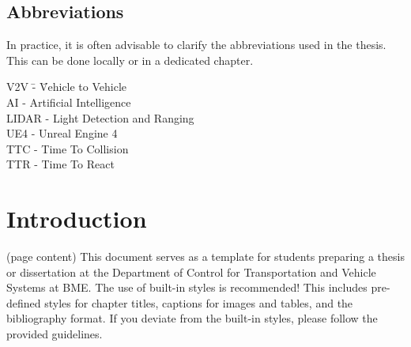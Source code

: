 \documentclass[12pt, a4paper, titlepage, onehalfspacing]{report}
\begin{document}
\tableofcontents
\begin{abstract}
Lorem ipsum dolor sit amet, consectetur adipiscing elit. Ut quam odio, ultrices vitae ornare aliquam, lacinia id ligula. Aliquam accumsan dictum arcu non consequat. Aliquam fringilla nulla nibh, feugiat auctor sem hendrerit eget. Integer efficitur nulla et venenatis cursus. Vivamus vel sem nunc. Sed erat ex, pulvinar at sapien sed, lacinia bibendum nunc. Nam tincidunt quam a lacinia tempus. Fusce eget rutrum purus. Ut malesuada consectetur ex, a blandit velit viverra non. Nam sit amet luctus quam. Praesent eu dolor blandit, dignissim lorem non, bibendum urna. Maecenas condimentum enim ut tortor venenatis, ac cursus nunc rutrum. Aliquam ipsum risus, varius ac consectetur vulputate, tristique non odio. Quisque a tristique neque, quis malesuada nunc.

Donec sed sem ac magna tristique venenatis porttitor ut nunc. Etiam convallis nec tortor nec posuere. Nullam a volutpat urna. Nullam dui risus, tincidunt sit amet maximus nec, semper eget lectus. Suspendisse vel hendrerit erat, tempor dapibus.

\end{abstract}

\section*{Abbreviations}
In practice, it is often advisable to clarify the abbreviations used in the thesis. This can be done locally or in a dedicated chapter. 
\begin{tabbing}
    V2V \hspace{3em} \= - \hspace{3em} \= Vehicle to Vehicle
    \\  AI\> - \> Artificial Intelligence
    \\  LIDAR\> - \>Light Detection and Ranging 
    \\  UE4\> - \> Unreal Engine 4
    \\  TTC\> - \> Time To Collision
    \\  TTR\> - \>Time To React
\end{tabbing}

\chapter{Introduction}
(page content) This document serves as a template for students preparing a thesis or dissertation at the Department of Control for Transportation and Vehicle Systems at BME. The use of built-in styles is recommended! This includes pre-defined styles for chapter titles, captions for images and tables, and the bibliography format. If you deviate from the built-in styles, please follow the provided guidelines.
\end{document}
